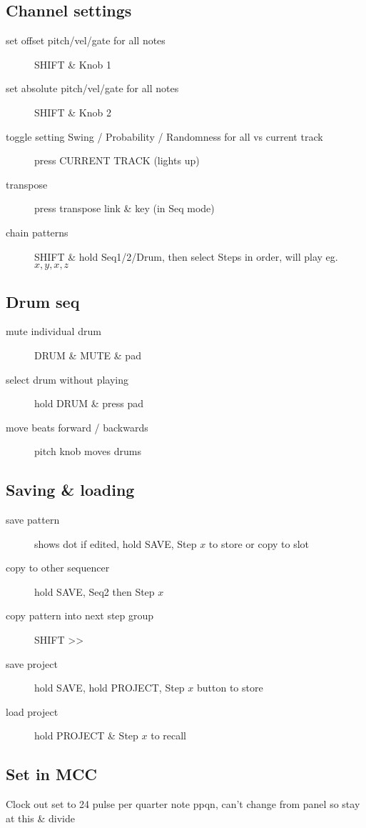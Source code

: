 \documentclass{tufte-handout}
\begin{document}
\subsection{Channel settings}

\begin{description}
\item[set offset pitch/vel/gate for all notes] SHIFT \& Knob 1
\item[set absolute pitch/vel/gate for all notes] SHIFT \& Knob 2
\item[toggle setting Swing / Probability / Randomness for all vs current track] press CURRENT TRACK (lights up)
\item[transpose] press transpose link \& key (in Seq mode)\\
\item[chain patterns] SHIFT \& hold Seq1/2/Drum, then select Steps in order, will play eg. $x, y, x, z$
\end{description}


\subsection{Drum seq }
\begin{description}
\item[mute individual drum] DRUM \& MUTE \& pad
\item[select drum without playing] hold DRUM \& press pad
\item[move beats forward / backwards] pitch knob moves drums 
\end{description}


\subsection{Saving \& loading}
\begin{description}
\item[save pattern] shows dot if edited, hold SAVE, Step $x$ to store or copy to slot
\item[copy to other sequencer] hold SAVE, Seq2 then Step $x$
\item[copy pattern into next step group] SHIFT >> 
\item[save project] hold SAVE, hold PROJECT, Step $x$ button to store
\item[load project] hold PROJECT \& Step $x$ to recall
\end{description}


\subsection{Set in MCC}
Clock out set to 24 pulse per quarter note ppqn, can't change from panel so stay at this \& divide\\
\end{document}
